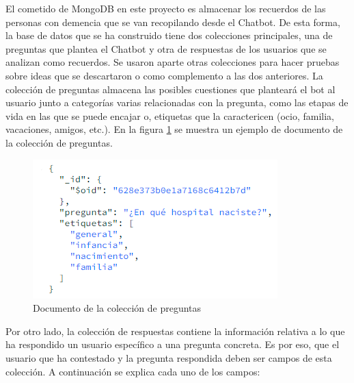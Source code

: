 El cometido de MongoDB en este proyecto es almacenar los recuerdos de las personas con demencia que se van recopilando desde el Chatbot. De esta forma, la base de datos que se ha construido tiene dos colecciones principales, una de preguntas que plantea el Chatbot y otra de respuestas de los usuarios que se analizan como recuerdos. Se usaron aparte otras colecciones para hacer pruebas sobre ideas que se descartaron o como complemento a las dos anteriores. La colección de preguntas almacena las posibles cuestiones que planteará el bot al usuario junto a categorías varias relacionadas con la pregunta, como las etapas de vida en las que se puede encajar o, etiquetas que la caractericen (ocio, familia, vacaciones, amigos, etc.). En la figura \ref{fig:mongo_preg} se muestra un ejemplo de documento de la colección de preguntas.

\begin{figure}[h]
	\centering
	\includegraphics[scale=1.3]{Imagenes/Vectorial/mongo_pregunta}
	\caption{Documento de la colección de preguntas}
	\label{fig:mongo_preg}
\end{figure}

Por otro lado, la colección de respuestas contiene la información relativa a lo que ha respondido un usuario específico a una pregunta concreta. Es por eso, que el usuario que ha contestado y la pregunta respondida deben ser campos de esta colección. A continuación se explica cada uno de los campos:


